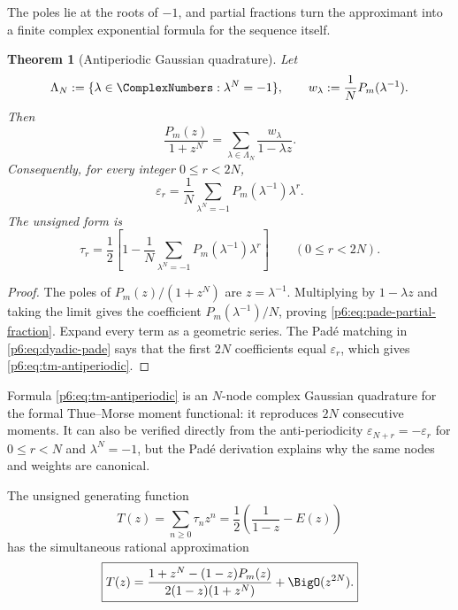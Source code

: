 \documentclass[11pt]{article}
\newtheorem{theorem}{Theorem}[section]
\theoremstyle{definition}
\theoremstyle{remark}
\newcommand{\eps}{\varepsilon}
\begin{document}
The poles lie at the roots of \(-1\), and partial fractions turn the approximant into a
finite complex exponential formula for the sequence itself.

\begin{theorem}[Antiperiodic Gaussian quadrature]
\label{p6:thm:antiperiodic-quadrature}
Let
\begin{equation}
 \Lambda_N:=\{\lambda\in\ComplexNumbers:\lambda^N=-1\},
 \qquad
 w_\lambda:=\frac1N P_m(\lambda^{-1}).                     \label{p6:eq:lambda-weights}
\end{equation}
Then
\begin{equation}
 \frac{P_m(z)}{1+z^N}
 =\sum_{\lambda\in\Lambda_N}\frac{w_\lambda}{1-\lambda z}.
                                                               \label{p6:eq:pade-partial-fraction}
\end{equation}
Consequently, for every integer \(0\le r<2N\),
\begin{equation}
\boxed{
 \eps_r=\frac1N\sum_{\lambda^N=-1}
 P_m(\lambda^{-1})\lambda^r.}                              \label{p6:eq:tm-antiperiodic}
\end{equation}
The unsigned form is
\begin{equation}
 \tau_r=\frac12\left[1-\frac1N\sum_{\lambda^N=-1}
 P_m(\lambda^{-1})\lambda^r\right]
 \qquad(0\le r<2N).                                       \label{p6:eq:tau-antiperiodic}
\end{equation}
\end{theorem}

\begin{proof}
The poles of \(P_m(z)/(1+z^N)\) are \(z=\lambda^{-1}\).  Multiplying by
\(1-\lambda z\) and taking the limit gives the coefficient
\(P_m(\lambda^{-1})/N\), proving \eqref{p6:eq:pade-partial-fraction}.  Expand every term as
a geometric series.  The Pad\'e matching in \eqref{p6:eq:dyadic-pade} says that the first
\(2N\) coefficients equal \(\eps_r\), which gives \eqref{p6:eq:tm-antiperiodic}.
\end{proof}

Formula \eqref{p6:eq:tm-antiperiodic} is an \(N\)-node complex Gaussian quadrature for the
formal Thue--Morse moment functional: it reproduces \(2N\) consecutive moments.  It can
also be verified directly from the anti-periodicity
\(\eps_{N+r}=-\eps_r\) for \(0\le r<N\) and
\(\lambda^N=-1\), but the Pad\'e derivation explains why the same nodes and weights are
canonical.

The unsigned generating function
\begin{equation}
 T(z)=\sum_{n\ge0}\tau_nz^n=\frac12\left(\frac1{1-z}-E(z)\right)                 \label{p6:eq:T-repeat}
\end{equation}
has the simultaneous rational approximation
\begin{equation}
\boxed{
 T(z)=
 \frac{1+z^N-(1-z)P_m(z)}{2(1-z)(1+z^N)}
 +\BigO(z^{2N}).}                                           \label{p6:eq:tau-pade}
\end{equation}
\end{document}
